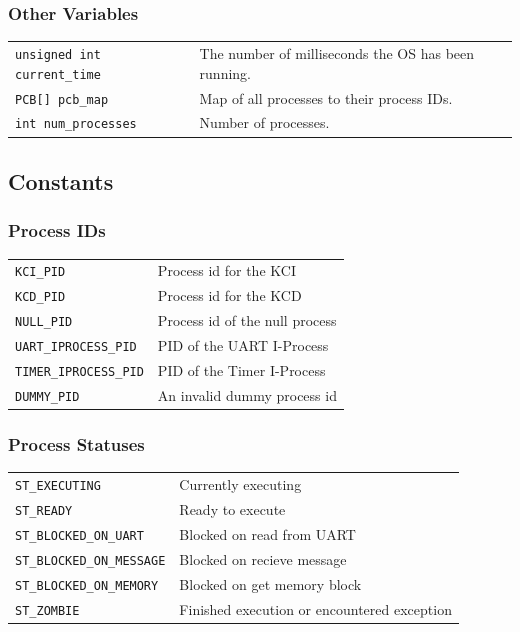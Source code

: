 \documentclass[titlepage]{article}
\begin{document}
\subsubsection{Other Variables}
\begin{tabular}{ll}
\verb!unsigned int current_time! & The number of milliseconds the OS has been running.\\
\verb!PCB[] pcb_map! & Map of all processes to their process IDs.\\
\verb!int num_processes! & Number of processes.\\
\end{tabular}

\subsection{Constants}

\subsubsection{Process IDs}
\begin{tabular}{ll}
\verb!KCI_PID! & Process id for the KCI \\
\verb!KCD_PID! & Process id for the KCD \\
\verb!NULL_PID! & Process id of the null process \\
\verb!UART_IPROCESS_PID! & PID of the UART I-Process \\
\verb!TIMER_IPROCESS_PID! & PID of the Timer I-Process \\
\verb!DUMMY_PID! & An invalid dummy process id \\
\end{tabular}
\subsubsection{Process Statuses}
\begin{tabular}{ll}
\verb!ST_EXECUTING! & Currently executing \\
\verb!ST_READY! & Ready to execute \\
\verb!ST_BLOCKED_ON_UART! & Blocked on read from UART \\
\verb!ST_BLOCKED_ON_MESSAGE! & Blocked on recieve message \\
\verb!ST_BLOCKED_ON_MEMORY! & Blocked on get memory block \\
\verb!ST_ZOMBIE! & Finished execution or encountered exception\\
\end{tabular}
\end{document}
